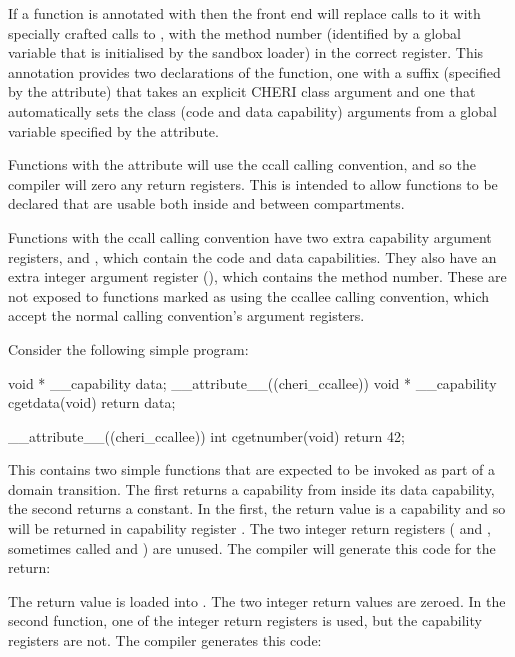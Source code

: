 If a function is annotated with  then the front end will replace calls to it with specially crafted calls to , with the method number (identified by a global variable that is initialised by the sandbox loader) in the correct register.
This annotation provides two declarations of the function, one with a suffix (specified by the  attribute) that takes an explicit CHERI class argument and one that automatically sets the class (code and data capability) arguments from a global variable specified by the  attribute.

Functions with the  attribute will use the ccall calling convention, and so the compiler will zero any return registers.  This is intended to allow functions to be declared that are usable both inside and between compartments.

Functions with the ccall calling convention have two extra capability argument registers,  and , which contain the code and data capabilities.  
They also have an extra integer argument register (), which contains the method number.  These are not exposed to functions marked as using the ccallee calling convention, which accept the normal calling convention's argument registers.  

Consider the following simple program:

\begin{csnippet}
void * __capability data;
__attribute__((cheri_ccallee))
void * __capability cgetdata(void)
{
	return data;
}

__attribute__((cheri_ccallee))
int cgetnumber(void)
{
	return 42;
}
\end{csnippet}

This contains two simple functions that are expected to be invoked as part of a domain transition.  The first returns a capability from inside its data capability, the second returns a constant.  In the first, the return value is a capability and so will be returned in capability register .  The two integer return registers ( and , sometimes called  and ) are unused.  The compiler will generate this code for the return:


The return value is loaded into .  The two integer return values are zeroed.  In the second function, one of the integer return registers is used, but the capability registers are not.  The compiler generates this code:

